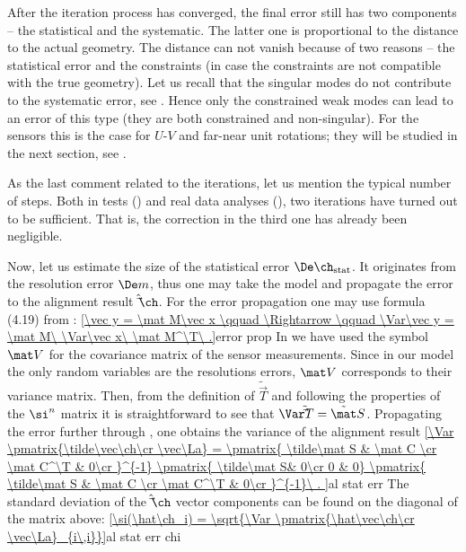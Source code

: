 
After the iteration process has converged, the final error still has two components -- the statistical and the systematic. The latter one is proportional to the distance to the actual geometry. The distance can not vanish because of two reasons -- the statistical error and the constraints (in case the constraints are not compatible with the true geometry). Let us recall that the singular modes do not contribute to the systematic error, see . Hence only the constrained weak modes can lead to an error of this type (they are both constrained and non-singular). For the  sensors this is the case for $U$-$V$ and far-near unit rotations; they will be studied in the next section, see .

As the last comment related to the iterations, let us mention the typical number of steps. Both in  tests () and real data analyses (), two iterations have turned out to be sufficient. That is, the correction in the third one has already been negligible.

Now, let us estimate the size of the statistical error $\De\ch_{\rm stat}$. It originates from the resolution error $\De m$, thus one may take the model  and propagate the error to the alignment result $\hat\vec\ch$. For the error propagation one may use formula (4.19) from :
\eqref{\vec y = \mat M\vec x \qquad \Rightarrow \qquad \Var\vec y = \mat M\ \Var\vec x\ \mat M^\T\ .}{error prop}
In  we have used the symbol $\mat V$ for the covariance matrix of the sensor measurements. Since in our model the only random variables are the resolutions errors, $\mat V$ corresponds to their variance matrix. Then, from the definition of $\tilde\vec T$  and following the properties of the $\si^n$ matrix  it is straightforward to see that $\Var \tilde\vec T = \tilde\mat S$. Propagating the error further through , one obtains the variance of the alignment result
\eqref{\Var \pmatrix{\tilde\vec\ch\cr \vec\La} = 
	\pmatrix{
		\tilde\mat S & \mat C \cr
		\mat C^\T & 0\cr
	}^{-1}
	\pmatrix{
		\tilde\mat S& 0\cr
		0 & 0}
	\pmatrix{
		\tilde\mat S & \mat C \cr
		\mat C^\T & 0\cr
	}^{-1}\ .
}{al stat err}
The standard deviation of the $\hat\vec\ch$ vector components can be found on the diagonal of the matrix above:
\eqref{\si(\hat\ch_i) = \sqrt{\Var \pmatrix{\hat\vec\ch\cr  \vec\La}_{i\,i}}}{al stat err chi}



